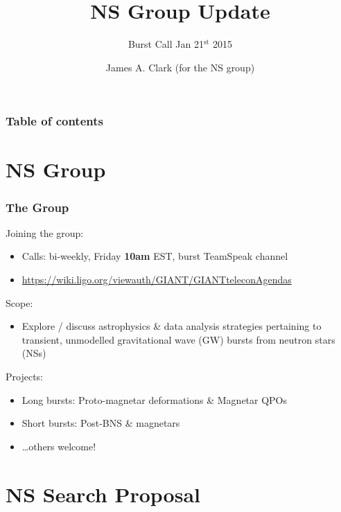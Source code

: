 \documentclass{beamer}
\def\gw#1{gravitational wave#1 (GW#1)\gdef\gw{GW}}
\def\ns#1{neutron star#1 (NS#1)\gdef\ns{NS}}
\begin{document}
\title{NS Group Update}
\subtitle{Burst Call Jan 21$^{\text{st}}$ 2015}  
\author{James A. Clark (for the NS group)}
\date{} 

\begin{frame}[plain]
\titlepage
\end{frame}

\begin{frame}\frametitle{Table of contents}\tableofcontents
\end{frame} 

\section{NS Group}

\begin{frame}
    \frametitle{The Group}
    Joining the group:
    \begin{itemize}
        \item Calls: bi-weekly, Friday {\bf 10am} EST, burst TeamSpeak channel
        \item
            {\small\href{https://wiki.ligo.org/viewauth/GIANT/GIANTteleconAgendas}
            {https://wiki.ligo.org/viewauth/GIANT/GIANTteleconAgendas}}
    \end{itemize}
    Scope:
    \begin{itemize}
        \item Explore / discuss astrophysics \& data analysis strategies
            pertaining to transient, unmodelled \gw{} bursts from \ns{s}
    \end{itemize}
    Projects:
    \begin{itemize}
        \item Long bursts: Proto-magnetar deformations \& Magnetar QPOs
        \item Short bursts: Post-BNS \& magnetars
        \item \dots others welcome!
    \end{itemize}
\end{frame}

\section{NS Search Proposal}
\end{document}
